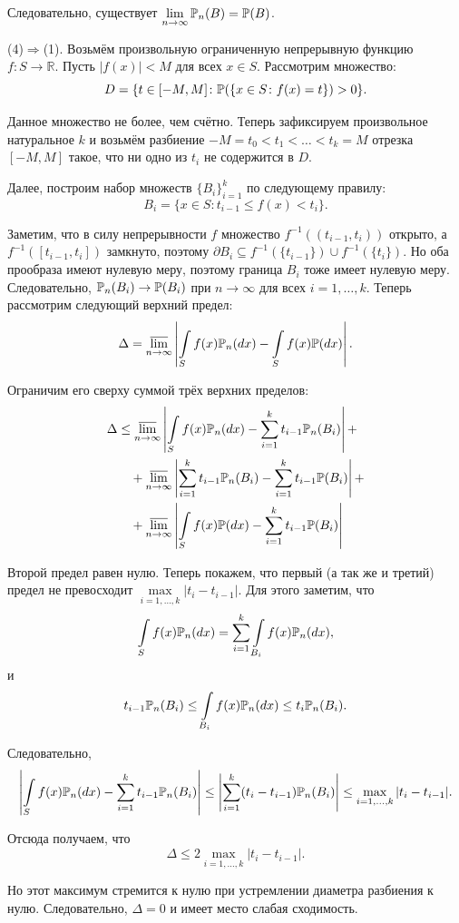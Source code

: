 {    Следовательно, существует $\lim\limits_{n \to \infty} \P_n(B) = \P(B)$.
    \vspace{1em}
    
    (4)$\Rightarrow$(1). Возьмём произвольную ограниченную непрерывную функцию $f \colon S \to \mathbb{R}$. Пусть $|f(x)| < M$ для всех $x \in S$. Рассмотрим множество:
    $$ D = \{t \in [-M, M] \colon \P(\{x \in S \colon f(x) = t\}) > 0\}. $$
    
    Данное множество не более, чем счётно. Теперь зафиксируем произвольное натуральное $k$ и возьмём разбиение $-M = t_0 < t_1 < \dots < t_k = M$ отрезка $[-M, M]$ такое, что ни одно из $t_i$ не содержится в $D$.
    
    Далее, построим набор множеств $\{B_i\}_{i=1}^k$ по следующему правилу:
    $$ B_i = \{x \in S \colon t_{i-1} \le f(x) < t_i\}. $$
    
    Заметим, что в силу непрерывности $f$ множество $f^{-1}((t_{i-1}, t_i))$ открыто, а $f^{-1}([t_{i-1}, t_i])$ замкнуто, поэтому $\partial B_i \subseteq f^{-1}(\{t_{i-1}\}) \cup f^{-1}(\{t_i\})$. Но оба прообраза имеют нулевую меру, поэтому граница $B_i$ тоже имеет нулевую меру. Следовательно, $\P_n(B_i) \to \P(B_i)$ при $n \to \infty$ для всех $i = 1, \dots, k$. Теперь рассмотрим следующий верхний предел:
    $$ \Delta = \varlimsup_{n \to \infty} \left| \int\limits_S f(x) \P_n(dx) - \int\limits_S f(x) \P(dx) \right|. $$
    
    Ограничим его сверху суммой трёх верхних пределов:
    \begin{align*}
        \Delta &\le \varlimsup_{n \to \infty} \left| \int\limits_S f(x) \P_n(dx) - \sum_{i=1}^k t_{i-1} \P_n(B_i) \right| + \\
        &\quad + \varlimsup_{n \to \infty} \left| \sum_{i=1}^k t_{i-1} \P_n(B_i) - \sum_{i=1}^k t_{i-1} \P(B_i) \right| + \\
        &\quad + \varlimsup_{n \to \infty} \left| \int\limits_S f(x) \P(dx) - \sum_{i=1}^k t_{i-1} \P(B_i) \right|
    \end{align*}
    
    Второй предел равен нулю. Теперь покажем, что первый (а так же и третий) предел не превосходит $\max\limits_{i=1, \dots, k} |t_i - t_{i-1}|$. Для этого заметим, что
    $$ \int\limits_S f(x) \P_n(dx) = \sum_{i=1}^k \int\limits_{B_i} f(x) \P_n(dx), $$
    и
    $$ t_{i-1} \P_n(B_i) \le \int\limits_{B_i} f(x) \P_n(dx) \le t_i \P_n(B_i). $$
    
    Следовательно,
    $$ \left| \int\limits_S f(x) \P_n(dx) - \sum_{i=1}^k t_{i-1} \P_n(B_i) \right| \le \left| \sum_{i=1}^k (t_i - t_{i-1}) \P_n(B_i) \right| \le \max_{i=1, \dots, k} |t_i - t_{i-1}|. $$
    
    Отсюда получаем, что
    $$ \Delta \le 2 \max_{i=1, \dots, k} |t_i - t_{i-1}|. $$
    
    Но этот максимум стремится к нулю при устремлении диаметра разбиения к нулю. Следовательно, $\Delta = 0$ и имеет место слабая сходимость.
}
